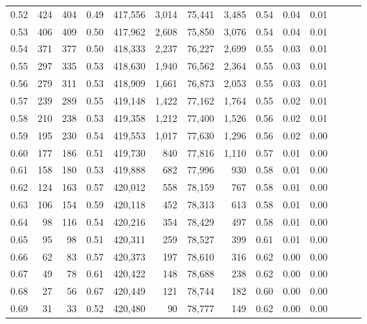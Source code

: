 \begin{tabular}{rrrrrrrrrrrrrr}
0.52 &     424 &    404 &  0.49 &  417,556 &    3,014 &  75,441 &   3,485 &  0.54 &  0.04 &      0.01 \\
0.53 &     406 &    409 &  0.50 &  417,962 &    2,608 &  75,850 &   3,076 &  0.54 &  0.04 &      0.01 \\
0.54 &     371 &    377 &  0.50 &  418,333 &    2,237 &  76,227 &   2,699 &  0.55 &  0.03 &      0.01 \\
0.55 &     297 &    335 &  0.53 &  418,630 &    1,940 &  76,562 &   2,364 &  0.55 &  0.03 &      0.01 \\
0.56 &     279 &    311 &  0.53 &  418,909 &    1,661 &  76,873 &   2,053 &  0.55 &  0.03 &      0.01 \\
0.57 &     239 &    289 &  0.55 &  419,148 &    1,422 &  77,162 &   1,764 &  0.55 &  0.02 &      0.01 \\
0.58 &     210 &    238 &  0.53 &  419,358 &    1,212 &  77,400 &   1,526 &  0.56 &  0.02 &      0.01 \\
0.59 &     195 &    230 &  0.54 &  419,553 &    1,017 &  77,630 &   1,296 &  0.56 &  0.02 &      0.00 \\
0.60 &     177 &    186 &  0.51 &  419,730 &      840 &  77,816 &   1,110 &  0.57 &  0.01 &      0.00 \\
0.61 &     158 &    180 &  0.53 &  419,888 &      682 &  77,996 &     930 &  0.58 &  0.01 &      0.00 \\
0.62 &     124 &    163 &  0.57 &  420,012 &      558 &  78,159 &     767 &  0.58 &  0.01 &      0.00 \\
0.63 &     106 &    154 &  0.59 &  420,118 &      452 &  78,313 &     613 &  0.58 &  0.01 &      0.00 \\
0.64 &      98 &    116 &  0.54 &  420,216 &      354 &  78,429 &     497 &  0.58 &  0.01 &      0.00 \\
0.65 &      95 &     98 &  0.51 &  420,311 &      259 &  78,527 &     399 &  0.61 &  0.01 &      0.00 \\
0.66 &      62 &     83 &  0.57 &  420,373 &      197 &  78,610 &     316 &  0.62 &  0.00 &      0.00 \\
0.67 &      49 &     78 &  0.61 &  420,422 &      148 &  78,688 &     238 &  0.62 &  0.00 &      0.00 \\
0.68 &      27 &     56 &  0.67 &  420,449 &      121 &  78,744 &     182 &  0.60 &  0.00 &      0.00 \\
0.69 &      31 &     33 &  0.52 &  420,480 &       90 &  78,777 &     149 &  0.62 &  0.00 &      0.00 \\

\end{tabular}
